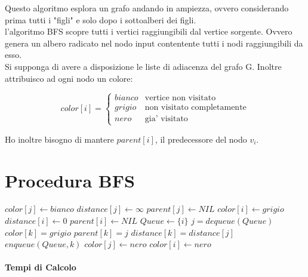 Questo algoritmo esplora un grafo andando in ampiezza, ovvero considerando prima tutti i "figli" e solo dopo i sottoalberi dei figli. \\
l'algoritmo BFS scopre tutti i vertici raggiungibili dal vertice sorgente. Ovvero genera un albero radicato nel nodo input contentente tutti i nodi raggiungibili da esso. \\
Si supponga di avere a disposizione le liste di adiacenza del grafo G.
Inoltre attribuisco ad ogni nodo un colore:

\[
    color[i] = 
    \begin{cases}
        bianco & \text{vertice non visitato}\\
        grigio & \text{non visitato completamente}\\
        nero & \text{gia' visitato}
    \end{cases}
\]

Ho inoltre bisogno di mantere $parent[i]$, il predecessore del nodo $v_{i}$.

\newpage

\section{Procedura BFS}

\begin{algorithm}
    \begin{algorithmic}
            \State $color[j] \gets bianco$
            \State $distance[j] \gets \infty$
            \State $parent[j] \gets NIL$
        \EndFor
        \State $color[i] \gets grigio$ 
        \State $distance[i] \gets 0$ 
        \State $parent[i] \gets NIL$
        \State $Queue \gets \{i\}$
            \State $j = dequeue(Queue)$
                    \State $color[k] = grigio$
                    \State $parent[k] = j$
                    \State $distance[k] = distance[j]$
                    \State $enqueue(Queue, k)$
                \EndIf
            \EndFor
            \State $color[j] \gets nero$ 
        \EndWhile
        \State $color[i] \gets nero$ 
        \EndProcedure
    \end{algorithmic}
\end{algorithm}

\paragraph{Tempi di Calcolo}

